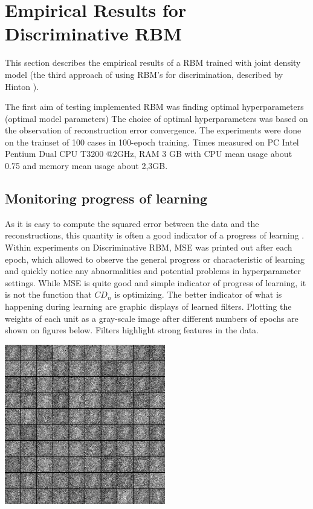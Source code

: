 \documentclass[a4paper]{scrartcl}
\begin{document}
\section{Empirical Results for Discriminative RBM}
This section describes the empirical results of a RBM trained with joint density model (the third approach of using RBM's for discrimination, described by Hinton \cite{Hinton}).
\par The first aim of testing implemented RBM was finding optimal hyperparameters (optimal model parameters) The choice of optimal hyperparameters was based on the observation of reconstruction error convergence. The experiments were done on the trainset of 100 cases in 100-epoch training. Times measured on PC Intel Pentium Dual CPU T3200 @2GHz, RAM 3 GB with CPU mean usage about 0.75 and memory mean usage about 2,3GB.
\subsection{Monitoring progress of learning}
As it is easy to compute the squared error between the data and the reconstructions, this quantity is often a good indicator of a progress of learning \cite{Hinton}. Within experiments on Discriminative RBM, MSE was printed out after each epoch, which allowed to observe the general progress or characteristic of learning and quickly notice any abnormalities and potential problems in hyperparameter settings. 
While MSE is quite good and simple indicator of progress of learning, it is not the function that $CD_n$ is optimizing. The better indicator of what is happening during learning are graphic displays of learned filters. Plotting the weights of each unit as a gray-scale image after different numbers of epochs are shown on figures below. Filters highlight strong features in the data.
\begin{minipage}[t]{0.5\textwidth}
\includegraphics[width=7cm]{images/filtry_1epoch_50train.png}
\end{minipage}
\end{document}
